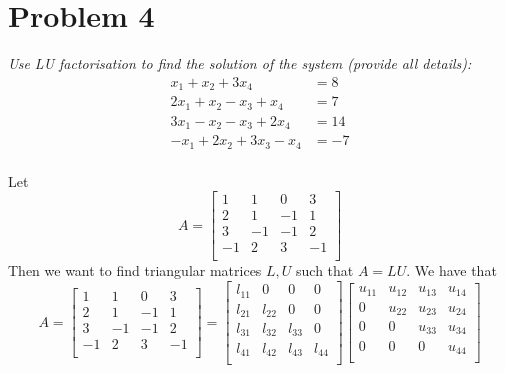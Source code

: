 \section{Problem 4}
\textit{Use LU factorisation to find the solution of the system (provide all details):}
\begin{align*}
    x_1 + x_2 + 3x_4 &= 8 \\
    2x_1 + x_2 - x_3 + x_4 &= 7 \\
    3x_1 - x_2 - x_3 + 2x_4 &= 14 \\
    -x_1 + 2x_2 + 3x_3 - x_4 &= -7 \\
\end{align*}

Let 
\begin{equation*}
    A = \begin{bmatrix}
        1 & 1 & 0 & 3 \\
        2 & 1 & -1 & 1 \\
        3 & -1 & -1 & 2 \\
        -1 & 2 & 3 & -1 \\
    \end{bmatrix}
\end{equation*}
Then we want to find triangular matrices $L, U$ such that $A = LU$. We have that
\begin{equation*}
    A = \begin{bmatrix}
        1 & 1 & 0 & 3 \\
        2 & 1 & -1 & 1 \\
        3 & -1 & -1 & 2 \\
        -1 & 2 & 3 & -1 \\
    \end{bmatrix}
     = \begin{bmatrix}
        l_{11} & 0 & 0 & 0 \\
        l_{21} & l_{22} & 0 & 0 \\
        l_{31} & l_{32} & l_{33} & 0 \\
        l_{41} & l_{42} & l_{43} & l_{44} \\
    \end{bmatrix}
    \begin{bmatrix}
        u_{11} & u_{12} & u_{13} & u_{14} \\
        0 & u_{22} & u_{23} & u_{24} \\
        0 & 0 & u_{33} & u_{34} \\
        0 & 0 & 0 & u_{44} \\
    \end{bmatrix}
\end{equation*}

